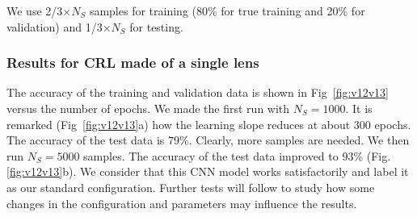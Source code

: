 \documentclass{iucr}
\begin{document}
 We use 2/3$\times N_S$ samples for training (80\% for true training and 20\% for validation) and 1/3$\times N_S$ for testing. 
 
 \subsubsection{Results for CRL made of a single lens}
 The accuracy of the training and validation data is shown in Fig~\ref{fig:v12v13} versus the number of epochs.
 We made the first run with $N_S=1000$.
 It is remarked (Fig~\ref{fig:v12v13}a) how the learning slope reduces at about 300 epochs. The accuracy of the test data is 79\%.
 Clearly, more samples are needed. We then run $N_S=5000$ samples. The accuracy of the test data improved to 93\% (Fig.\ref{fig:v12v13}b).
 We consider that this CNN model works satisfactorily and label it as our standard configuration. Further tests will follow to study how some changes in the configuration and parameters may influence the results.
\end{document}
